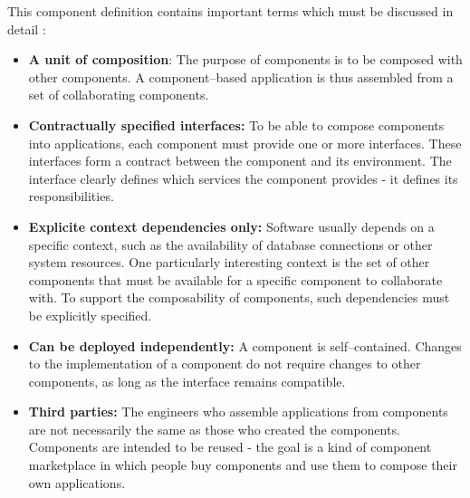 \noindent
This component definition contains important terms which must be discussed 
in detail \cite{ServerComponentPatterns02}:
\begin{itemize}
\item {\bf A unit of composition}:
The purpose of components is to be composed with other components.
A component--based application is thus assembled from a set of
collaborating components.

\item {\bf Contractually specified interfaces:}
To be able to compose components into applications, each component must provide
one or more interfaces.
These interfaces form a contract between the component and its environment.
The interface clearly defines which services the component provides - 
it defines its responsibilities.

\item {\bf Explicite context dependencies only:}
Software usually depends on a specific context, such as the availability of
database connections or other system resources.
One particularly interesting context is the set of other components that
must be available for a specific component to collaborate with.
To support the composability of components, such dependencies must be
explicitly specified.

\item {\bf Can be deployed independently:}
A component is self--contained. Changes to the implementation of a component
do not require changes to other components, as long as the interface remains
compatible.

\item {\bf Third parties:}
The engineers who assemble applications from components are not necessarily 
the same as those who created the components.
Components are intended to be reused - the goal is a kind of component
marketplace in which people buy components and use them to compose their own 
applications.

\end{itemize}



